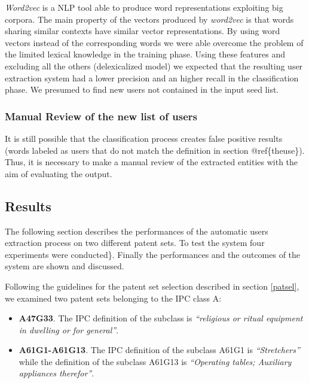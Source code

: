 \documentclass[]{book}
\providecommand{\tightlist}{%
  \setlength{\itemsep}{0pt}\setlength{\parskip}{0pt}}
\begin{document}
\emph{Word2vec} is a NLP tool able to produce word representations
exploiting big corpora. The main property of the vectors produced by
\emph{word2vec} is that words sharing similar contexts have similar
vector representations. By using word vectors instead of the
corresponding words we were able overcome the problem of the limited
lexical knowledge in the training phase. Using these features and
excluding all the others (delexicalized model) we expected that the
resulting user extraction system had a lower precision and an higher
recall in the classification phase. We presumed to find new users not
contained in the input seed list.

\subsubsection*{Manual Review of the new list of
users}\label{manual-review-of-the-new-list-of-users}

It is still possible that the classification process creates false
positive results (words labeled as users that do not match the
definition in section @ref\{theuse\}). Thus, it is necessary to make a
manual review of the extracted entities with the aim of evaluating the
output.

\subsection{Results}\label{results}

The following section describes the performances of the automatic users
extraction process on two different patent sets. To test the system four
experiments were conducted\}. Finally the performances and the outcomes
of the system are shown and discussed.

Following the guidelines for the patent set selection described in
section \ref{patsel}, we examined two patent sets belonging to the IPC
class A:

\begin{itemize}
\tightlist
\item
  \textbf{A47G33}. The IPC definition of the subclass is
  \emph{``religious or ritual equipment in dwelling or for general''}.
\item
  \textbf{A61G1-A61G13}. The IPC definition of the subclass A61G1 is
  \emph{``Stretchers''} while the definition of the subclass A61G13 is
  \emph{``Operating tables; Auxiliary appliances therefor''}.
\end{itemize}
\end{document}
